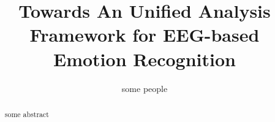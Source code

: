 \documentclass{sig-alternate}
\begin{document}
%

\title{Towards An Unified Analysis Framework for EEG-based Emotion Recognition}


%
\author{
%
%
\alignauthor
some people
}



\maketitle
\begin{abstract}
some abstract
\end{abstract}


\end{document}
